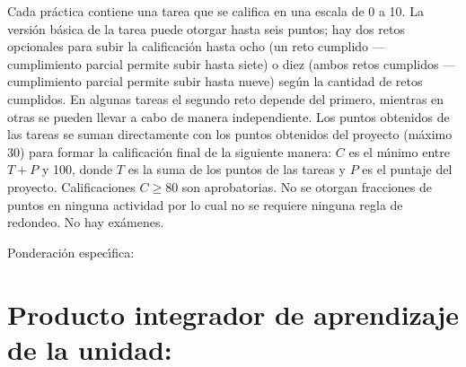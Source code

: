 \documentclass[10 pt]{article}
\begin{document}
Cada pr\'{a}ctica contiene una tarea que se califica en una escala de
0 a 10. La versi\'{o}n b\'{a}sica de la tarea puede otorgar hasta seis
puntos; hay dos retos opcionales para subir la calificaci\'{o}n hasta
ocho (un reto cumplido --- cumplimiento parcial permite subir hasta
siete) o diez (ambos retos cumplidos --- cumplimiento parcial permite
subir hasta nueve) seg\'{u}n la cantidad de retos cumplidos. En
algunas tareas el segundo reto depende del primero, mientras en otras
se pueden llevar a cabo de manera independiente.  Los puntos obtenidos
de las tareas se suman directamente con los puntos obtenidos del
proyecto (m\'{a}ximo 30) para formar la calificaci\'{o}n final de la
siguiente manera: $C$ es el m\'{\i}nimo entre $T + P$ y 100, donde $T$
es la suma de los puntos de las tareas y $P$ es el puntaje del
proyecto.  Calificaciones $C \geq 80$ son aprobatorias. No se otorgan
fracciones de puntos en ninguna actividad por lo cual no se requiere
ninguna regla de redondeo. No hay ex\'{a}menes.

Ponderaci\'{o}n espec\'{\i}fica:



\newpage

\section{Producto integrador de aprendizaje de la unidad:}
\end{document}
